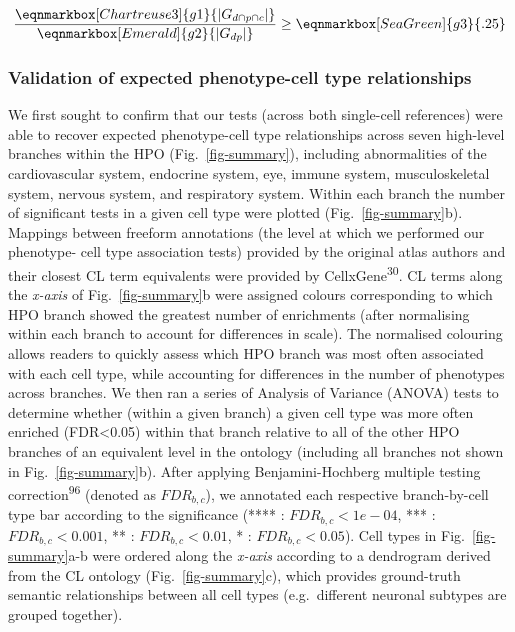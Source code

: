 \documentclass[
]{article}
\begin{document}
\hfill\break

\begin{equation*}
  \frac{
     \eqnmarkbox[Chartreuse3]{g1}{|G_{d \cap p \cap c} |}
    }{
       \eqnmarkbox[Emerald]{g2}{|G_{dp}|}} 
  \geq \eqnmarkbox[SeaGreen]{g3}{.25} 
\end{equation*}

\hfill\break
\hfill\break

\subsubsection{Validation of expected phenotype-cell type
relationships}\label{validation-of-expected-phenotype-cell-type-relationships-1}

We first sought to confirm that our tests (across both single-cell
references) were able to recover expected phenotype-cell type
relationships across seven high-level branches within the HPO
(Fig.~\ref{fig-summary}), including abnormalities of the cardiovascular
system, endocrine system, eye, immune system, musculoskeletal system,
nervous system, and respiratory system. Within each branch the number of
significant tests in a given cell type were plotted
(Fig.~\ref{fig-summary}b). Mappings between freeform annotations (the
level at which we performed our phenotype- cell type association tests)
provided by the original atlas authors and their closest CL term
equivalents were provided by CellxGene\textsuperscript{30}. CL terms
along the \emph{x-axis} of Fig.~\ref{fig-summary}b were assigned colours
corresponding to which HPO branch showed the greatest number of
enrichments (after normalising within each branch to account for
differences in scale). The normalised colouring allows readers to
quickly assess which HPO branch was most often associated with each cell
type, while accounting for differences in the number of phenotypes
across branches. We then ran a series of Analysis of Variance (ANOVA)
tests to determine whether (within a given branch) a given cell type was
more often enriched (FDR\textless0.05) within that branch relative to
all of the other HPO branches of an equivalent level in the ontology
(including all branches not shown in Fig.~\ref{fig-summary}b). After
applying Benjamini-Hochberg multiple testing
correction\textsuperscript{96} (denoted as \(FDR _{b,c}\)), we annotated
each respective branch-by-cell type bar according to the significance
(**** : \(FDR _{b,c}<1e-04\), *** : \(FDR _{b,c}<0.001\), ** :
\(FDR _{b,c}<0.01\), * : \(FDR _{b,c}<0.05\)). Cell types in
Fig.~\ref{fig-summary}a-b were ordered along the \emph{x-axis} according
to a dendrogram derived from the CL ontology (Fig.~\ref{fig-summary}c),
which provides ground-truth semantic relationships between all cell
types (e.g.~different neuronal subtypes are grouped together).
\end{document}
